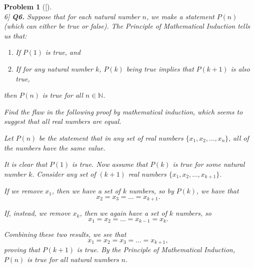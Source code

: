 \documentclass[12pt]{article}
\newtheorem{problemx}{Problem}
\newenvironment{problem}[1]{%
	\begin{problemx}[#1]\leavevmode\\[0.5em] %
	}{%
	\end{problemx}
}
\begin{document}
	\begin{problem}[6]
\textbf{Q6.} Suppose that for each natural number $n$, we make a statement $P(n)$ (which can either be true or false). The \textit{Principle of Mathematical Induction} tells us that:
\begin{enumerate}
	\item If $P(1)$ is true, and
	\item If for any natural number $k$, $P(k)$ being true implies that $P(k + 1)$ is also true,
\end{enumerate}
then $P(n)$ is true for all $n \in \mathbb{N}$.

Find the flaw in the following proof by mathematical induction, which seems to suggest that all real numbers are equal.

Let $P(n)$ be the statement that in any set of real numbers $\{x_1, x_2, \dots, x_n\}$, all of the numbers have the same value. 

It is clear that $P(1)$ is true. Now assume that $P(k)$ is true for some natural number $k$. Consider any set of $(k+1)$ real numbers $\{x_1, x_2, \dots, x_{k+1}\}$. 

If we remove $x_1$, then we have a set of $k$ numbers, so by $P(k)$, we have that 
$$x_2 = x_3 = \dots = x_{k+1}.$$

If, instead, we remove $x_k$, then we again have a set of $k$ numbers, so 
$$x_1 = x_2 = \dots = x_{k-1} = x_k.$$

Combining these two results, we see that 
$$x_1 = x_2 = x_3 = \dots = x_{k+1},$$
proving that $P(k+1)$ is true. By the Principle of Mathematical Induction, $P(n)$ is true for all natural numbers $n$.
	\end{problem}
	
\end{document}
